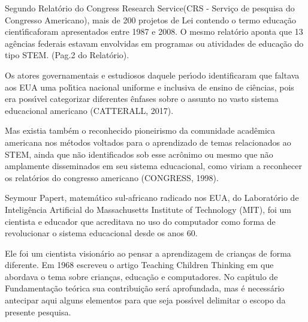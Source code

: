 \documentclass[
12pt,		%
openright,	%
twoside,  %
a4paper,			%
chapter=TITLE,		%
english,			%
french,				%
spanish,			%
brazil				%
]{USPSC-classe/USPSC}
\begin{document}
Segundo Relat\'orio do \textquotedbl Congress Research Service\textquotedbl  (CRS - Servi\c{c}o de pesquisa do Congresso Americano), mais de 200 projetos de Lei contendo o termo \textquotedbl educa\c{c}\~ao cient\'{\i}fica\textquotedbl  foram apresentados entre 1987 e 2008. O mesmo relat\'orio aponta que 13 ag\^encias federais estavam envolvidas em programas ou atividades de educa\c{c}\~ao do tipo \textquotedbl STEM\textquotedbl . (Pag.2 do Relat\'orio).










Os atores governamentais e estudiosos daquele per\'{\i}odo identificaram que faltava aos EUA uma pol\'{\i}tica nacional uniforme e inclusiva de ensino de ci\^encias, pois era poss\'{\i}vel categorizar diferentes \^enfases sobre o assunto no vasto sistema educacional americano  (CATTERALL, 2017).










Mas existia tamb\'em o reconhecido pioneirismo da comunidade acad\^emica americana nos m\'etodos voltados para o aprendizado de temas relacionados ao STEM, ainda que n\~ao identificados sob esse acr\^onimo ou mesmo que n\~ao amplamente disseminados em seu sistema educacional, como viriam a reconhecer os relat\'orios do congresso americano  (CONGRESS, 1998).










Seymour Papert, matem\'atico sul-africano radicado nos EUA, do Laborat\'orio de Intelig\^encia Artificial do Massachusetts Institute of Technology (MIT), foi um  cientista e educador que acreditava  no  uso do computador como forma de revolucionar o sistema  educacional  desde os anos 60.










Ele foi um cientista vision\'ario ao pensar a aprendizagem de crian\c{c}as de forma diferente. Em 1968 escreveu o artigo \textquotedbl  Teaching Children Thinking \textquotedbl   em que abordava  o tema sobre crian\c{c}as, educa\c{c}\~ao e computadores. No cap\'{\i}tulo de Fundamenta\c{c}\~ao te\'orica sua contribui\c{c}\~ao ser\'a aprofundada, mas \'e necess\'ario antecipar aqui alguns elementos para que seja poss\'{\i}vel delimitar o escopo da presente pesquisa.
\end{document}
